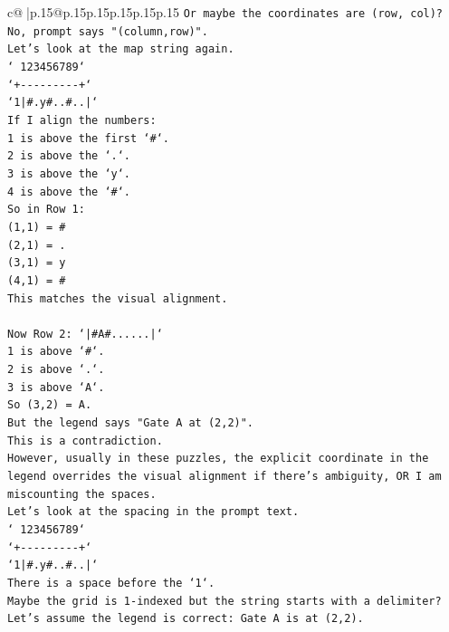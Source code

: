 \documentclass{article}
\begin{document}
{\begin{supertabular}{c@{$\;$}|p{.15\linewidth}@{}p{.15\linewidth}p{.15\linewidth}p{.15\linewidth}p{.15\linewidth}p{.15\linewidth}}
{{{\texttt{Or maybe the coordinates are (row, col)? No, prompt says "(column,row)".} \\
\texttt{Let's look at the map string again.} \\
\texttt{` 123456789`} \\
\texttt{`+{-}{-}{-}{-}{-}{-}{-}{-}{-}+`} \\
\texttt{`1|\#.y\#..\#..|`} \\
\texttt{If I align the numbers:} \\
\texttt{1 is above the first `\#`.} \\
\texttt{2 is above the `.`.} \\
\texttt{3 is above the `y`.} \\
\texttt{4 is above the `\#`.} \\
\texttt{So in Row 1:} \\
\texttt{(1,1) = \#} \\
\texttt{(2,1) = .} \\
\texttt{(3,1) = y} \\
\texttt{(4,1) = \#} \\
\texttt{This matches the visual alignment.} \\
\\ 
\texttt{Now Row 2: `|\#A\#......|`} \\
\texttt{1 is above `\#`.} \\
\texttt{2 is above `.`.} \\
\texttt{3 is above `A`.} \\
\texttt{So (3,2) = A.} \\
\texttt{But the legend says "Gate A at (2,2)".} \\
\texttt{This is a contradiction.} \\
\texttt{However, usually in these puzzles, the explicit coordinate in the legend overrides the visual alignment if there's ambiguity, OR I am miscounting the spaces.} \\
\texttt{Let's look at the spacing in the prompt text.} \\
\texttt{` 123456789`} \\
\texttt{`+{-}{-}{-}{-}{-}{-}{-}{-}{-}+`} \\
\texttt{`1|\#.y\#..\#..|`} \\
\texttt{There is a space before the `1`.} \\
\texttt{Maybe the grid is 1{-}indexed but the string starts with a delimiter?} \\
\texttt{Let's assume the legend is correct: Gate A is at (2,2).} \\
}}}
\end{supertabular}}
\end{document}
